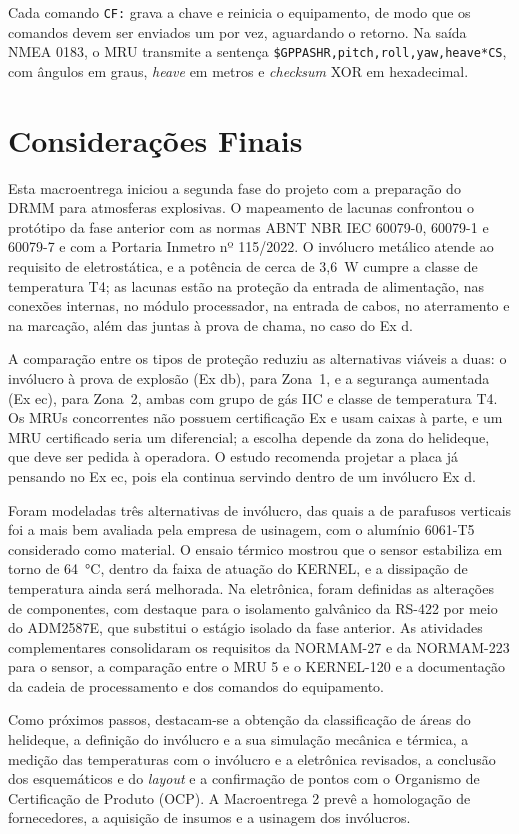\documentclass[a4paper, 12pt]{article}
\begin{document}
Cada comando \texttt{CF:} grava a chave e reinicia o equipamento, de modo que os comandos
devem ser enviados um por vez, aguardando o retorno. Na saída NMEA 0183, o MRU transmite a
sentença \texttt{\$GPPASHR,pitch,roll,yaw,heave*CS}, com ângulos em graus, \textit{heave}
em metros e \textit{checksum} XOR em hexadecimal.



\newpage
\section{Considerações Finais}\label{sec:consideracoes}

Esta macroentrega iniciou a segunda fase do projeto com a preparação do DRMM para atmosferas explosivas. O mapeamento de lacunas confrontou o protótipo da fase anterior com as normas ABNT NBR IEC 60079-0, 60079-1 e 60079-7 e com a Portaria Inmetro nº 115/2022. O invólucro metálico atende ao requisito de eletrostática, e a potência de cerca de 3,6~W cumpre a classe de temperatura T4; as lacunas estão na proteção da entrada de alimentação, nas conexões internas, no módulo processador, na entrada de cabos, no aterramento e na marcação, além das juntas à prova de chama, no caso do Ex d.

A comparação entre os tipos de proteção reduziu as alternativas viáveis a duas: o invólucro à prova de explosão (Ex db), para Zona~1, e a segurança aumentada (Ex ec), para Zona~2, ambas com grupo de gás IIC e classe de temperatura T4. Os MRUs concorrentes não possuem certificação Ex e usam caixas à parte, e um MRU certificado seria um diferencial; a escolha depende da zona do helideque, que deve ser pedida à operadora. O estudo recomenda projetar a placa já pensando no Ex ec, pois ela continua servindo dentro de um invólucro Ex d.

Foram modeladas três alternativas de invólucro, das quais a de parafusos verticais foi a mais bem avaliada pela empresa de usinagem, com o alumínio 6061-T5 considerado como material. O ensaio térmico mostrou que o sensor estabiliza em torno de 64~°C, dentro da faixa de atuação do KERNEL, e a dissipação de temperatura ainda será melhorada. Na eletrônica, foram definidas as alterações de componentes, com destaque para o isolamento galvânico da RS-422 por meio do ADM2587E, que substitui o estágio isolado da fase anterior. As atividades complementares consolidaram os requisitos da NORMAM-27 e da NORMAM-223 para o sensor, a comparação entre o MRU 5 e o KERNEL-120 e a documentação da cadeia de processamento e dos comandos do equipamento.

Como próximos passos, destacam-se a obtenção da classificação de áreas do helideque, a definição do invólucro e a sua simulação mecânica e térmica, a medição das temperaturas com o invólucro e a eletrônica revisados, a conclusão dos esquemáticos e do \textit{layout} e a confirmação de pontos com o Organismo de Certificação de Produto (OCP). A Macroentrega 2 prevê a homologação de fornecedores, a aquisição de insumos e a usinagem dos invólucros.

\newpage

\end{document}

